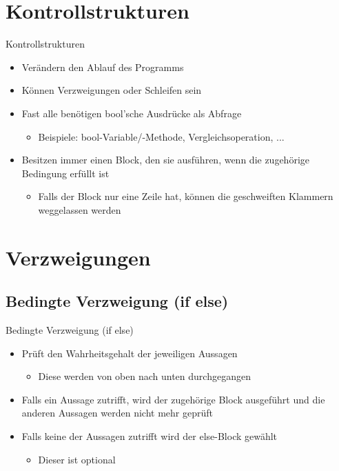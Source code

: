 \section{Kontrollstrukturen}
\begin{frame}{Kontrollstrukturen}
	\begin{itemize}
		\item Verändern den Ablauf des Programms
		\item Können Verzweigungen oder Schleifen sein
		\item Fast alle benötigen bool'sche Ausdrücke als Abfrage
		\begin{itemize}
			\item Beispiele: bool-Variable/-Methode, Vergleichsoperation, ...
		\end{itemize}
		\item Besitzen immer einen Block, den sie ausführen, wenn die zugehörige Bedingung erfüllt ist
		\begin{itemize}
			\item Falls der Block nur eine Zeile hat, können die geschweiften Klammern weggelassen werden
		\end{itemize}
	\end{itemize}
\end{frame}

\section{Verzweigungen}
\subsection{Bedingte Verzweigung (if else)}
\begin{frame}{Bedingte Verzweigung (if else)}
	\begin{itemize}
		\item Prüft den Wahrheitsgehalt der jeweiligen Aussagen
		\begin{itemize}
			\item Diese werden von oben nach unten durchgegangen
		\end{itemize}
		\item Falls ein Aussage zutrifft, wird der zugehörige Block ausgeführt und die anderen Aussagen werden nicht mehr geprüft
		\item Falls keine der Aussagen zutrifft wird der \alert{else}-Block gewählt
		\begin{itemize}
			\item Dieser ist optional
		\end{itemize}
	\end{itemize}
	
\end{frame}

